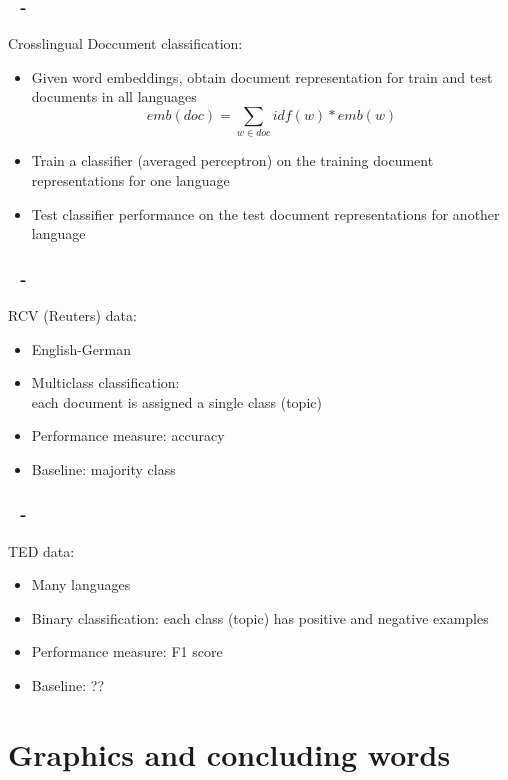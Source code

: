 \documentclass{beamer}
\newenvironment{dia}
{
\begin{frame}[fragile, environment=dia]
\frametitle{\insertsection
\ifx\insertsubsection\empty\else
      \,~-~\insertsubsection             %
   \fi}
}
{
\end{frame}
}
\begin{document}
\begin{dia}
Crosslingual Doccument classification:
\begin{itemize}
\item Given word embeddings, obtain document representation for train and test documents in all languages
\begin{equation*}
emb(doc)=\sum_{w\in doc} idf(w)*emb(w)
\end{equation*}
\item Train a classifier (averaged perceptron) on the training document representations for one language
\item Test classifier performance on the test document representations for another language
\end{itemize}
\end{dia}



\begin{dia}
RCV (Reuters) data:
\begin{itemize}
\item English-German
\item Multiclass classification: \\
each document is assigned a single class (topic)
\item Performance measure: accuracy
\item Baseline: majority class
\end{itemize}
\end{dia}


\begin{dia}
TED data:
\begin{itemize}
\item Many languages
\item Binary classification: each class (topic) has positive and negative examples
\item Performance measure: F1 score
\item Baseline: ??
\end{itemize}
\end{dia}



\section{Graphics and concluding words}
\end{document}
